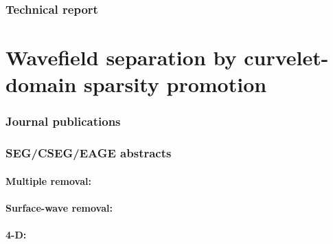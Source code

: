 \documentclass{article}
\begin{document}
\noindent
{} 
\noindent
{}

\subsubsection*{Technical report}
\label{sec:technical-report-1}

\noindent
{} 

\section*{Wavefield separation by curvelet-domain sparsity
  promotion}\label{sec:wavefield-separation}
%
\subsubsection*{Journal publications}
\label{sec:journal-publications-3}

\noindent
{} 
\noindent
{} 

\subsubsection*{SEG/CSEG/EAGE abstracts}
\label{sec:seg.cs-abstr}
%
\paragraph{Multiple removal:}
\label{sec:multiple-removal}
%
\noindent
{} 
\noindent
{} 
\noindent
{} 
\noindent
{} 
\noindent
{} 
\noindent
{} 
\noindent
{} 
\noindent
{}
\noindent
{}
\noindent
{} 

\paragraph{Surface-wave removal:}
\label{sec:surface-wave-removal}

\noindent
{} 
\noindent
{} 
\noindent
{} 
\noindent
{}

\paragraph{4-D:}

\noindent
{} 
\noindent
{} 
\noindent
{} 
\end{document}
